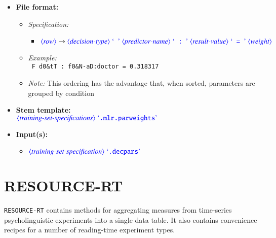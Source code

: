 \documentclass[12pt]{report}
\def\magenta{\color{magenta}}
\begin{document}
\begin{itemize}
      \item \textbf{File format:}
      \begin{itemize}
            \item \textit{Specification:}
            \begin{itemize}
                  \item {\small $\dtype{row} \rightarrow \dtype{decision-type} \ \dcode{\ } \ \dtype{predictor-name} \ \dcode{\ :\ } \ \dtype{result-value} \ \dcode{\ =\ } \ \dtype{weight}$}
            \end{itemize}
            \item \textit{Example:}\\
            {\magenta\tt
            F d0\&tT : f0\&N-aD:doctor = 0.318317
            }
            \item \textit{Note:} This ordering has the advantage that, when sorted, parameters are grouped by condition
      \end{itemize}
      \item \textbf{Stem template:}\\
      $\dtype{training-set-specifications}  \ \dcode{.mlr.parweights}$
      \item \textbf{Input(s):}
      \begin{itemize}
            \item $\dtype{training-set-specification} \ \dcode{.decpars}$
      \end{itemize}
\end{itemize}







\chapter{RESOURCE-RT}

{\tt RESOURCE-RT} contains methods for aggregating measures from time-series psycholinguistic experiments into a single data table.
It also contains convenience recipes for a number of reading-time experiment types.
\end{document}
